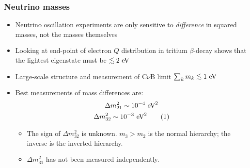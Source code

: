 \subsubsection{Neutrino masses}
\begin{itemize}
  \item Neutrino oscillation experiments are only sensitive to \emph{difference} in squared masses, not the masses themselves
  \item Looking at end-point of electron $Q$ distribution in tritium $\beta$-decay shows that the lightest eigenstate must be $\lesssim 2~\text{eV}$
  \item Large-scale structure and measurement of C$\nu$B limit $\sum_k m_{k} \lesssim 1~\text{eV}$
  \item Best measurements of mass differences are:
  \begin{gather*}
    \Delta m_{21}^2 \sim 10^{-4}~\ev^2\\
    \Delta m_{32}^2 \sim 10^{-3}~\ev^2\numberthis
  \end{gather*}
  \begin{itemize}
    \item The sign of $\Delta m_{32}^2$ is unknown. $m_3>m_2$ is the normal hierarchy; the inverse is the inverted hierarchy.
    \item $\Delta m_{31}^2$ has not been measured independently.
  \end{itemize}
\end{itemize}

